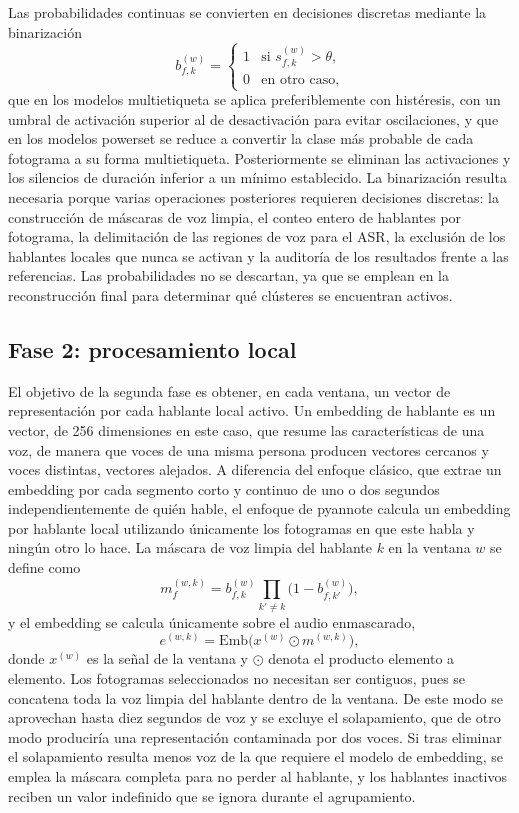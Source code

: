 \documentclass[11pt,a4paper]{article}
\begin{document}
Las probabilidades continuas se convierten en decisiones discretas mediante la binarización
\begin{equation}
b^{(w)}_{f,k}=\begin{cases}1 & \text{si } s^{(w)}_{f,k}>\theta,\\ 0 & \text{en otro caso,}\end{cases}
\end{equation}
que en los modelos multietiqueta se aplica preferiblemente con histéresis, con un umbral de activación superior al de desactivación para evitar oscilaciones, y que en los modelos powerset se reduce a convertir la clase más probable de cada fotograma a su forma multietiqueta. Posteriormente se eliminan las activaciones y los silencios de duración inferior a un mínimo establecido. La binarización resulta necesaria porque varias operaciones posteriores requieren decisiones discretas: la construcción de máscaras de voz limpia, el conteo entero de hablantes por fotograma, la delimitación de las regiones de voz para el ASR, la exclusión de los hablantes locales que nunca se activan y la auditoría de los resultados frente a las referencias. Las probabilidades no se descartan, ya que se emplean en la reconstrucción final para determinar qué clústeres se encuentran activos.

\subsection{Fase 2: procesamiento local}

El objetivo de la segunda fase es obtener, en cada ventana, un vector de representación por cada hablante local activo. Un embedding de hablante es un vector, de 256 dimensiones en este caso, que resume las características de una voz, de manera que voces de una misma persona producen vectores cercanos y voces distintas, vectores alejados. A diferencia del enfoque clásico, que extrae un embedding por cada segmento corto y continuo de uno o dos segundos independientemente de quién hable, el enfoque de pyannote calcula un embedding por hablante local utilizando únicamente los fotogramas en que este habla y ningún otro lo hace. La máscara de voz limpia del hablante $k$ en la ventana $w$ se define como
\begin{equation}
m^{(w,k)}_{f}=b^{(w)}_{f,k}\prod_{k'\neq k}\bigl(1-b^{(w)}_{f,k'}\bigr),
\end{equation}
y el embedding se calcula únicamente sobre el audio enmascarado,
\begin{equation}
e^{(w,k)}=\mathrm{Emb}\bigl(x^{(w)}\odot m^{(w,k)}\bigr),
\end{equation}
donde $x^{(w)}$ es la señal de la ventana y $\odot$ denota el producto elemento a elemento. Los fotogramas seleccionados no necesitan ser contiguos, pues se concatena toda la voz limpia del hablante dentro de la ventana. De este modo se aprovechan hasta diez segundos de voz y se excluye el solapamiento, que de otro modo produciría una representación contaminada por dos voces. Si tras eliminar el solapamiento resulta menos voz de la que requiere el modelo de embedding, se emplea la máscara completa para no perder al hablante, y los hablantes inactivos reciben un valor indefinido que se ignora durante el agrupamiento.
\end{document}
